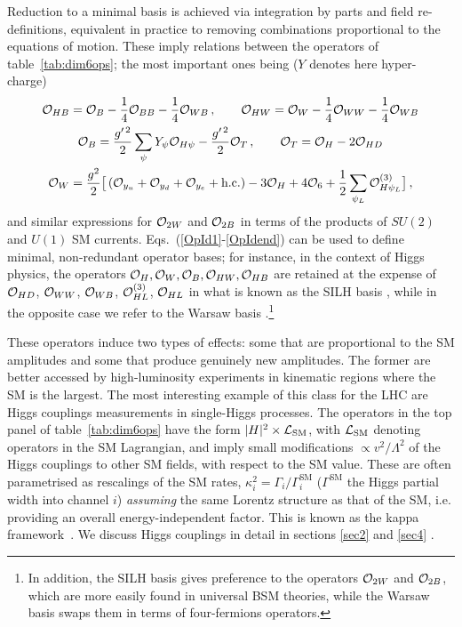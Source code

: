 Reduction to a minimal basis is achieved via  integration by parts and  field re-definitions, equivalent in practice to removing combinations proportional to the equations of motion. 
These imply  relations between the operators of table~\ref{tab:dim6ops}; the most important ones being ($Y$ denotes here  hyper-charge)
\begin{gather}
{\cal O}_{HB}={\cal O}_{B}-\frac{1}{4}{\cal O}_{BB}-\frac{1}{4}{\cal O}_{WB}\,,\quad \quad {\cal O}_{HW}={\cal O}_W-\frac{1}{4}{\cal O}_{WW}-\frac{1}{4}{\cal O}_{WB}\label{OpId1}\\
{\cal O}_B= \frac{g^{\prime\, 2}}{2}\sum_\psi Y_\psi {\cal O}_{H\psi}  -\frac{g^{\prime\, 2}}{2}{\cal O}_T\,,\quad\quad  {\cal O}_T={\cal O}_H-2{\cal O}_{HD}\\
{\cal O}_W= \frac{g^2}{2}\big[\left({\cal O}_{y_u}+{\cal O}_{y_d}+{\cal O}_{y_e}+\text{h.c.}\right)-3{\cal O}_{H}+4{\cal O}_{6} +  \frac{1}{2}\sum_{\psi_L} {\cal O}_{H\psi_L}^{(3)}\big]\, ,
 \label{OpIdend}
\end{gather}
and similar expressions for ${\cal O}_{2W}$ and ${\cal O}_{2B}$ in terms of the products of $SU(2)$ and $U(1)$ SM currents.
Eqs.~(\ref{OpId1}-\ref{OpIdend}) can be used to define minimal,  non-redundant operator bases; for instance, in the context of Higgs physics, the operators ${\cal O}_H,{\cal O}_W, {\cal O}_B,{\cal O}_{HW},{\cal O}_{HB}$ are retained  at the expense of  ${\cal O}_{HD}$, ${\cal O}_{WW}$, ${\cal O}_{WB}$, ${\cal O}_{HL}^{(3)}$, ${\cal O}_{HL}$ in what is known as the SILH basis \cite{Giudice:2007fh}, while in the opposite case  we refer to the Warsaw basis \cite{Grzadkowski:2010es}.\footnote{In addition, the SILH basis gives preference to the operators ${\cal O}_{2W}$ and  ${\cal O}_{2B}$, which are more easily found in universal BSM theories, while the Warsaw basis swaps them in terms of four-fermions operators.}



These operators induce two types of effects: some that are proportional to the SM amplitudes and some that  produce  genuinely new amplitudes. The former are  better accessed by high-luminosity experiments in kinematic regions where the SM is the largest. The most interesting example of this class for the LHC are  Higgs couplings measurements in single-Higgs processes. 
The operators in the top panel of table~\ref{tab:dim6ops}  have the form 
$|H|^2 \times {\cal L}_{\textrm{SM}}$, with ${\cal L}_{\textrm{SM}}$ denoting operators in the SM Lagrangian, and  imply small modifications $\propto v^2/\Lambda^2$  of the Higgs couplings to other SM fields, with respect to the SM value.
These are often parametrised as rescalings of the SM rates, $\kappa_{i}^2=\Gamma_{i}/\Gamma^{\textrm{SM}}_{i}$ ($\Gamma^{\textrm{SM}}$ the  Higgs partial width into channel $i$)  \emph{assuming} the same Lorentz structure as that of the SM, i.e. providing an overall energy-independent factor. This is known as the kappa framework~\cite{Heinemeyer:2013tqa}. We discuss Higgs couplings in detail in sections \ref{sec2} and \ref{sec4} .

